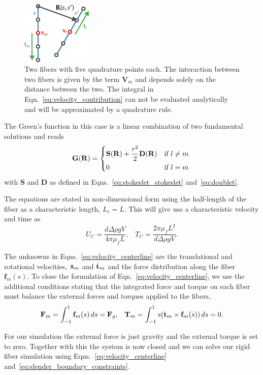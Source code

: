 \begin{figure}[!htbp]
  \centering
  \includegraphics[width=0.3\textwidth]{img/fiber_contribution.pdf}
  \caption[Two interacting fibers with five quadrature points.]{Two fibers with five quadrature points each. The interaction between two fibers is given by the term $\mathbf{V}_m$ and depends solely on the distance between the two. The integral in Eqn.~\eqref{eq:velocity_contribution} can not be evaluated analytically and will be approximated by a quadrature rule.}
  \label{fig:fiber_contribution}
\end{figure}

The Green's function in this case is a linear combination of two fundamental solutions and reads
\begin{equation}
  \label{eq:green_function}
  \mathbf{G}(\mathbf{R}) = \begin{dcases*}
  \mathbf{S}(\mathbf{R}) + \frac{r^2}{2}\mathbf{D}(\mathbf{R}) & if $l \neq m$\\
  0 & if $l = m$
  \end{dcases*}
\end{equation}
with $\mathbf{S}$ and $\mathbf{D}$ as defined in Eqns.~\eqref{eq:stokeslet_stokeslet} and~\eqref{eq:doublet}.

The equations are stated in non-dimensional form using the half-length of the fiber as a characteristic length, $L_c = L$. This will give use a characteristic velocity and time as
\begin{equation}
  U_C = \frac{d \Delta \rho g V}{4\pi\mu_fL} \text{,} \quad T_C = \frac{2\pi\mu_fL^2}{d \Delta \rho g V} \text{.}
\end{equation}

The unknowns in Eqns.~\eqref{eq:velocity_centerline} are the translational and rotational velocities, $\dot{\mathbf{x}}_m$ and $\dot{\mathbf{t}}_m$ and the force distribution along the fiber $\mathbf{f}_m(s)$. To close the formulation of Eqn.~\eqref{eq:velocity_centerline}, we use the additional conditions stating that the integrated force and torque on each fiber must balance the external forces and torques applied to the fibers,
\begin{equation}
	\label{eq:slender_boundary_constraints}
  \mathbf{F}_m = \int_{-1}^{1} \mathbf{f}_m(s) \, ds = \mathbf{F}_g \text{,} \quad \mathbf{T}_m = \int_{-1}^{1} s(\mathbf{t}_m \times \mathbf{f}_m(s)) \, ds = 0 \text{.}
\end{equation}

For our simulation the external force is just gravity and the external torque is set to zero. Together with this the system is now closed and we can solve our rigid fiber simulation using Eqns.~\eqref{eq:velocity_centerline} and~\eqref{eq:slender_boundary_constraints}.